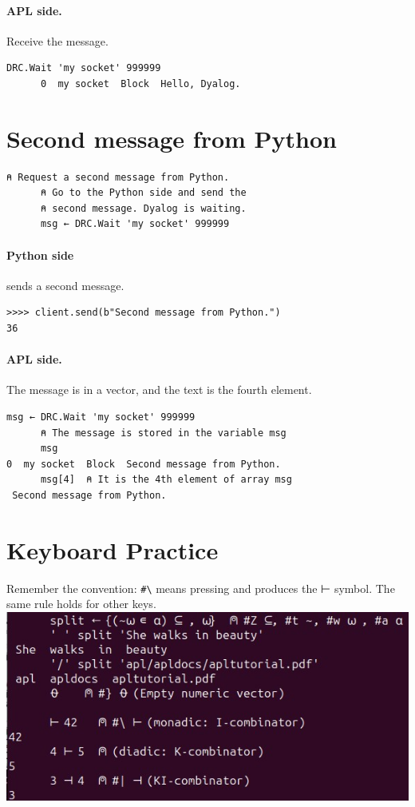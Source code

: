 \documentclass[a4paper,12pt]{book}
\begin{document}
\paragraph{APL side.} Receive the message.
\begin{lstlisting}[language=apl]
      DRC.Wait 'my socket' 999999
      0  my socket  Block  Hello, Dyalog.
\end{lstlisting}

\newpage
\section{Second message from Python}
\begin{lstlisting}[language=apl]
      ⍝ Request a second message from Python.
      ⍝ Go to the Python side and send the       
      ⍝ second message. Dyalog is waiting.
      msg ← DRC.Wait 'my socket' 999999
\end{lstlisting}

\paragraph{Python side} sends a second message.
\begin{verbatim}
>>>> client.send(b"Second message from Python.")
36
\end{verbatim}

\paragraph{APL side.} The message is in a vector,
and the text is the fourth element.
\begin{lstlisting}[language=apl]
      msg ← DRC.Wait 'my socket' 999999
      ⍝ The message is stored in the variable msg
      msg
0  my socket  Block  Second message from Python.
      msg[4]  ⍝ It is the 4th element of array msg
 Second message from Python.
\end{lstlisting}

\section{Keyboard Practice}
Remember the convention: \verb|#\| means
pressing \cmdkey{\verb|\|} and produces the ⊢ symbol.
The same rule holds for other keys.\\

\includegraphics{srcfigs/split.jpg}
\end{document}
